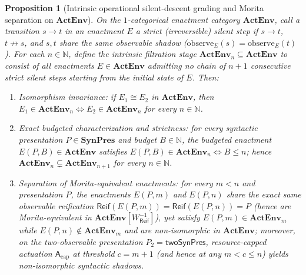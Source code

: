 \documentclass[11pt]{article}
\theoremstyle{plain}
\newtheorem{proposition}[theorem]{Proposition}
\theoremstyle{definition}
\begin{document}
\begin{proposition}[Intrinsic operational silent-descent grading and Morita separation on $\mathbf{ActEnv}$]\label{prop:resource-grading-model}
On the $1$-categorical enactment category $\mathbf{ActEnv}$, call a transition $s \to t$ in an enactment $E$ a \emph{strict (irreversible) silent step} if $s \to t$, $t \not\to s$, and $s, t$ share the same observable shadow ($\mathrm{observe}_E(s) = \mathrm{observe}_E(t)$). For each $n \in \mathbb{N}$, define the intrinsic filtration stage $\mathbf{ActEnv}_n \subseteq \mathbf{ActEnv}$ to consist of all enactments $E \in \mathbf{ActEnv}$ admitting no chain of $n+1$ consecutive strict silent steps starting from the initial state of $E$. Then:
\begin{enumerate}[nosep,label=(\roman*)]
\item \emph{Isomorphism invariance}: if $E_1 \cong E_2$ in $\mathbf{ActEnv}$, then $E_1 \in \mathbf{ActEnv}_n \iff E_2 \in \mathbf{ActEnv}_n$ for every $n \in \mathbb{N}$.
\item \emph{Exact budgeted characterization and strictness}: for every syntactic presentation $P \in \mathbf{SynPres}$ and budget $B \in \mathbb{N}$, the budgeted enactment $E(P, B) \in \mathbf{ActEnv}$ satisfies $E(P, B) \in \mathbf{ActEnv}_n \iff B \le n$; hence $\mathbf{ActEnv}_n \subsetneq \mathbf{ActEnv}_{n+1}$ for every $n \in \mathbb{N}$.
\item \emph{Separation of Morita-equivalent enactments}: for every $m < n$ and presentation $P$, the enactments $E(P, m)$ and $E(P, n)$ share the exact same observable reification $\mathsf{Reif}(E(P, m)) = \mathsf{Reif}(E(P, n)) = P$ (hence are Morita-equivalent in $\mathbf{ActEnv}[W_{\mathsf{Reif}}^{-1}]$), yet satisfy $E(P, m) \in \mathbf{ActEnv}_m$ while $E(P, n) \notin \mathbf{ActEnv}_m$ and are non-isomorphic in $\mathbf{ActEnv}$; moreover, on the two-observable presentation $P_2 = \mathsf{twoSynPres}$, resource-capped actuation $\mathsf{A}_{\mathrm{cap}}$ at threshold $c = m + 1$ (and hence at any $m < c \le n$) yields non-isomorphic syntactic shadows.
\end{enumerate}
\end{proposition}
\end{document}
